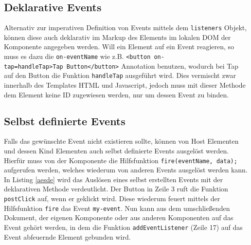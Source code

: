 \subsection{Deklarative Events}\label{deklarative-events}

Alternativ zur imperativen Definition von Events mittels dem \texttt{listeners} Objekt, können diese auch deklarativ im Markup des Elements im lokalen \ac{DOM} der Komponente angegeben werden. Will ein Element auf ein Event reagieren, so muss es dazu die \texttt{on-eventName} wie z.B. \texttt{\textless{}button\ on-tap=\dq handleTap\dq\textgreater{}Tap\ Button\textless{}/button\textgreater{}} Annotation benutzen, wodurch bei Tap auf den Button die Funktion \texttt{handleTap} ausgeführt wird. Dies vermischt zwar innerhalb des Templates \ac{HTML} und Javascript, jedoch muss mit dieser Methode dem Element keine ID zugewiesen werden, nur um dessen Event zu binden.


\subsection{Selbst definierte Events}\label{selbst-definierte-events}

Falls das gewünschte Event nicht existieren sollte, können von Host Elementen und dessen Kind Elementen auch selbst definierte Events ausgelöst werden. Hierfür muss von der Komponente die Hilfsfunktion \texttt{fire(eventName,\ data);} aufgerufen werden, welches wiederum von anderen Events ausgelöst werden kann. In Listing \ref{aesde} wird das Auslösen eines selbst erstellten Events mit der deklarativen Methode verdeutlicht. Der Button in Zeile 3 ruft die Funktion \texttt{postClick} auf, wenn er geklickt wird. Diese wiederum feuert mittels der Hilfsfunktion \texttt{fire} das Event \texttt{my-event}. Nun kann aus dem umschließenden Dokument, der eigenen Komponente oder aus anderen Komponenten auf das Event gehört werden, in dem die Funktion \texttt{addEventListener} (Zeile 17) auf das Event abfeuernde Element gebunden wird.


